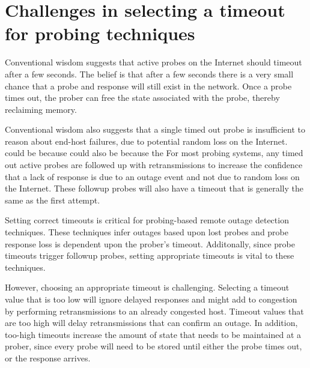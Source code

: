 \section{Challenges in selecting a timeout for probing techniques}
\label{sec:motivation}


Conventional wisdom suggests that active probes on the Internet should timeout
after a few seconds. The belief is that after a few seconds there is a very
small chance that a probe and response will still exist in the
network. Once a probe times out, the prober can free the state
associated with the probe, thereby reclaiming memory.

Conventional wisdom also suggests that a single timed out probe is
insufficient to reason about end-host failures, due to potential
random loss on the Internet. %
could be because %
could also be because the %
For most probing systems, any timed out active probes are followed up
with retransmissions to increase the confidence that a lack of
response is due to an outage event and not due to random loss on the
Internet. These followup probes will also have a timeout that is
generally the same as the first attempt.

Setting correct timeouts is critical for
probing-based remote outage detection techniques. These techniques infer outages
based upon lost probes and probe response loss is
dependent upon the prober's timeout. Additonally, since probe timeouts trigger followup probes, setting appropriate
timeouts is vital to these techniques. 

However, choosing an appropriate timeout is
challenging. Selecting a timeout value that is too low will ignore delayed
responses and might add to congestion by performing retransmissions to an
already congested host. Timeout values that are too high will delay
retransmissions that can confirm an outage. In addition, too-high timeouts
increase the amount of state that needs to be maintained at a prober, since
every probe will need to be stored until either the probe times out,
or the response arrives.


